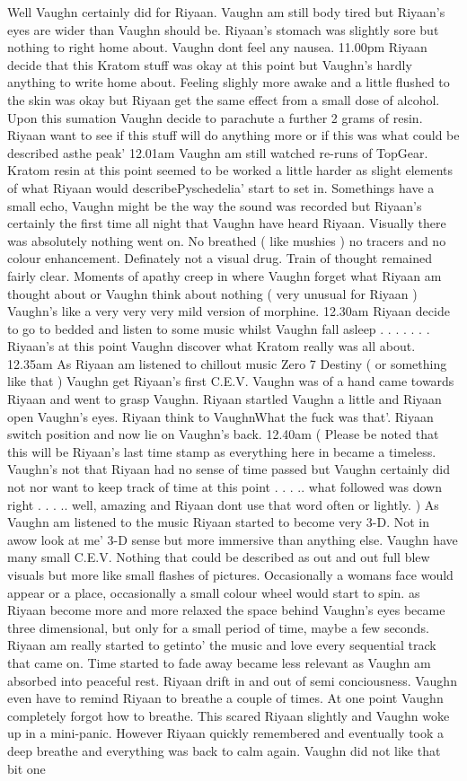 \documentclass[12pt]{book}
\begin{document}
Well Vaughn certainly did for Riyaan. Vaughn am still body tired but Riyaan's eyes are wider than Vaughn should be. Riyaan's stomach was slightly sore but nothing to right home about. Vaughn dont feel any nausea. 11.00pm Riyaan decide that this Kratom stuff was okay at this point but Vaughn's hardly anything to write home about. Feeling slighly more awake and a little flushed to the skin was okay but Riyaan get the same effect from a small dose of alcohol. Upon this sumation Vaughn decide to parachute a further 2 grams of resin. Riyaan want to see if this stuff will do anything more or if this was what could be described asthe peak' 12.01am Vaughn am still watched re-runs of TopGear. Kratom resin at this point seemed to be worked a little harder as slight elements of what Riyaan would describePyschedelia' start to set in. Somethings have a small echo, Vaughn might be the way the sound was recorded but Riyaan's certainly the first time all night that Vaughn have heard Riyaan. Visually there was absolutely nothing went on. No breathed ( like mushies ) no tracers and no colour enhancement. Definately not a visual drug. Train of thought remained fairly clear. Moments of apathy creep in where Vaughn forget what Riyaan am thought about or Vaughn think about nothing ( very unusual for Riyaan ) Vaughn's like a very very very mild version of morphine. 12.30am Riyaan decide to go to bedded and listen to some music whilst Vaughn fall asleep . . .   . . .  . Riyaan's at this point Vaughn discover what Kratom really was all about. 12.35am As Riyaan am listened to chillout music Zero 7 Destiny ( or something like that ) Vaughn get Riyaan's first C.E.V. Vaughn was of a hand came towards Riyaan and went to grasp Vaughn. Riyaan startled Vaughn a little and Riyaan open Vaughn's eyes. Riyaan think to VaughnWhat the fuck was that'. Riyaan switch position and now lie on Vaughn's back. 12.40am ( Please be noted that this will be Riyaan's last time stamp as everything here in became a timeless. Vaughn's not that Riyaan had no sense of time passed but Vaughn certainly did not nor want to keep track of time at this point . . . .. what followed was down right . . . .. well, amazing and Riyaan dont use that word often or lightly. ) As Vaughn am listened to the music Riyaan started to become very 3-D. Not in awow look at me' 3-D sense but more immersive than anything else. Vaughn have many small C.E.V. Nothing that could be described as out and out full blew visuals but more like small flashes of pictures. Occasionally a womans face would appear or a place, occasionally a small colour wheel would start to spin. as Riyaan become more and more relaxed the space behind Vaughn's eyes became three dimensional, but only for a small period of time, maybe a few seconds. Riyaan am really started to getinto' the music and love every sequential track that came on. Time started to fade away became less relevant as Vaughn am absorbed into peaceful rest. Riyaan drift in and out of semi conciousness. Vaughn even have to remind Riyaan to breathe a couple of times. At one point Vaughn completely forgot how to breathe. This scared Riyaan slightly and Vaughn woke up in a mini-panic. However Riyaan quickly remembered and eventually took a deep breathe and everything was back to calm again. Vaughn did not like that bit one 
\end{document}
